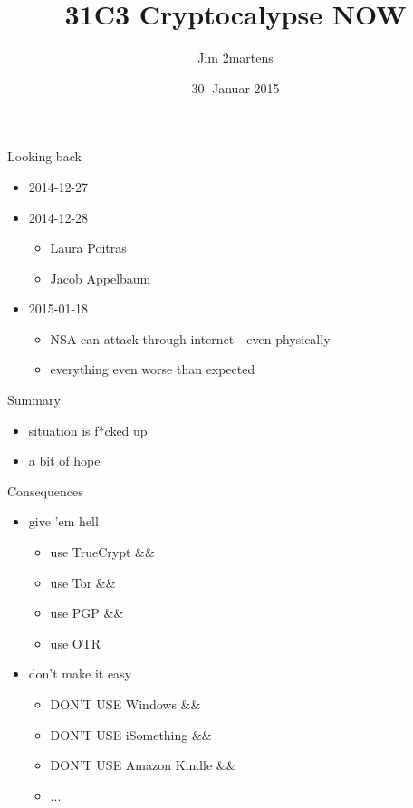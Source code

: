 \documentclass{beamer}
\begin{document}
\author{Jim 2martens}
\title{31C3 Cryptocalypse NOW}
\date{30. Januar 2015}

	\begin{frame}
		\titlepage
	\end{frame}
	
	\begin{frame}{Looking back}
		\begin{itemize}
			\item 2014-12-27
			\item<2-> 2014-12-28
				\begin{itemize}
					\item Laura Poitras
					\item Jacob Appelbaum
				\end{itemize}
			\item<3-> 2015-01-18
				\begin{itemize}
					\item NSA can attack through internet - even physically
					\item everything even worse than expected
				\end{itemize}
		\end{itemize}
	\end{frame}
	
	\begin{frame}{Summary}
		\begin{itemize}
			\item situation is f*cked up
			\item a bit of hope
		\end{itemize}
	\end{frame}
	
	\begin{frame}{Consequences}
		\begin{itemize}
			\item give 'em hell
			\begin{itemize}
				\item use TrueCrypt \&\&
				\item use Tor \&\&
				\item use PGP \&\&
				\item use OTR				
			\end{itemize}
			\item<2-> don't make it easy
			\begin{itemize}
				\item<3-> DON'T USE Windows \&\&
				\item<4-> DON'T USE iSomething \&\&
				\item<5-> DON'T USE Amazon Kindle \&\&
				\item<6-> ...
			\end{itemize}
		\end{itemize}
	\end{frame}
	
\end{document}
